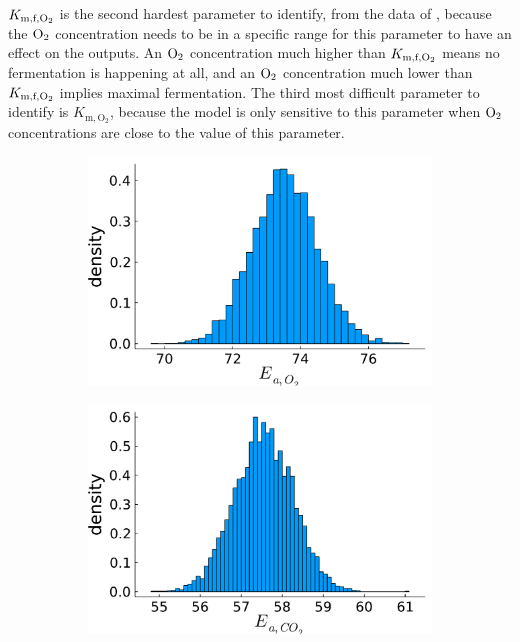 $K_{\text{m,f},\text{O}_2}$ is the second hardest parameter to identify, from the data of \textcite{ho}, because the $\text{O}_2$ concentration needs to be in a specific range for this parameter to have an effect on the outputs. An $\text{O}_2$ concentration much higher than $K_{\text{m,f},\text{O}_2}$ means no fermentation is happening at all, and an $\text{O}_2$ concentration much lower than $K_{\text{m,f},\text{O}_2}$ implies maximal fermentation. The third most difficult parameter to identify is  $K_{\text{m},\text{O}_2}$, because the model is only sensitive to this parameter when $\text{O}_2$ concentrations are close to the value of this parameter.
\begin{figure}[H]
	\centering
	\begin{subfigure}[b]{0.3\textwidth}
		\includegraphics[width=1.0\textwidth]{figure/paper 2/nuisance1.pdf}
	\end{subfigure}
	\begin{subfigure}[b]{0.3\textwidth}
		\centering
		\includegraphics[width=1.0\textwidth]{figure/paper 2/nuisance2.pdf}

\end{subfigure}
\end{figure}

